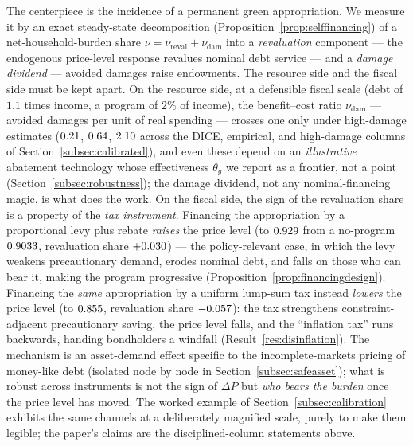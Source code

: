 \documentclass[12pt]{article}
\begin{document}
The centerpiece is the incidence of a permanent green appropriation. We
measure it by an exact steady-state decomposition
(Proposition~\ref{prop:selffinancing}) of a net-household-burden share
$\nu = \nu_{\mathrm{reval}} + \nu_{\mathrm{dam}}$
into a \emph{revaluation} component --- the endogenous price-level response
revalues nominal debt service --- and a \emph{damage dividend} --- avoided
damages raise endowments. The resource side and the fiscal side must be kept
apart. On the resource side, at a defensible fiscal scale (debt of $1.1$
times income, a program of $2\%$ of income), the
benefit--cost ratio $\nu_{\mathrm{dam}}$ --- avoided damages per unit of real
spending --- crosses one only under high-damage estimates
($0.21$, $0.64$, $2.10$ across the DICE, empirical, and high-damage
columns of Section~\ref{subsec:calibrated}), and even these depend on an
\emph{illustrative} abatement technology whose effectiveness $\theta_g$ we
report as a frontier, not a point (Section~\ref{subsec:robustness}); the
damage dividend, not any nominal-financing magic, is what does the work.
On the fiscal side, the sign of the revaluation share is a property of the
\emph{tax instrument}. Financing the appropriation by a proportional levy plus
rebate \emph{raises} the price level (to $0.929$ from a no-program
$0.9033$, revaluation share $+0.030$) --- the policy-relevant case, in
which the levy weakens precautionary demand, erodes nominal debt, and falls on
those who can bear it, making the program progressive
(Proposition~\ref{prop:financingdesign}). Financing the \emph{same}
appropriation by a uniform lump-sum tax instead \emph{lowers} the price level
(to $0.855$, revaluation share $-0.057$): the tax strengthens
constraint-adjacent precautionary saving, the price level falls, and the
``inflation tax'' runs backwards, handing bondholders a windfall
(Result~\ref{res:disinflation}). The mechanism is an asset-demand effect
specific to the incomplete-markets pricing of money-like debt (isolated node
by node in Section~\ref{subsec:safeasset}); what is robust across instruments
is not the sign of $\Delta P$ but \emph{who bears the burden} once the price
level has moved. The worked
example of Section~\ref{subsec:calibration} exhibits the same channels at a
deliberately magnified scale, purely to make
them legible; the paper's claims are the disciplined-column statements above.
\end{document}
